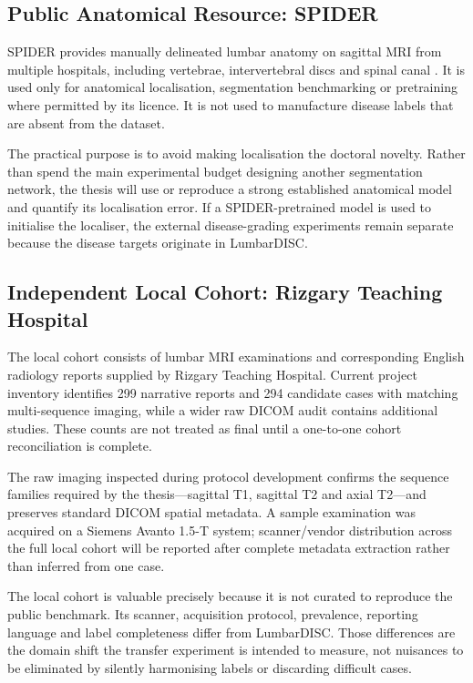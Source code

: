 \subsection{Public Anatomical Resource: SPIDER}
\label{sec:method-spider}

SPIDER provides manually delineated lumbar anatomy on sagittal MRI from multiple
hospitals, including vertebrae, intervertebral discs and spinal canal
\cite{vandergraaf2024lumbar}. It is used only for anatomical localisation,
segmentation benchmarking or pretraining where permitted by its licence. It is
not used to manufacture disease labels that are absent from the dataset.

The practical purpose is to avoid making localisation the doctoral novelty.
Rather than spend the main experimental budget designing another segmentation
network, the thesis will use or reproduce a strong established anatomical model
and quantify its localisation error. If a SPIDER-pretrained model is used to
initialise the localiser, the external disease-grading experiments remain
separate because the disease targets originate in LumbarDISC.

\subsection{Independent Local Cohort: Rizgary Teaching Hospital}
\label{sec:method-rizgary}

The local cohort consists of lumbar MRI examinations and corresponding English
radiology reports supplied by Rizgary Teaching Hospital. Current project
inventory identifies 299 narrative reports and 294 candidate cases with matching
multi-sequence imaging, while a wider raw DICOM audit contains additional
studies. These counts are not treated as final until a one-to-one cohort
reconciliation is complete.

The raw imaging inspected during protocol development confirms the sequence
families required by the thesis---sagittal T1, sagittal T2 and axial T2---and
preserves standard DICOM spatial metadata. A sample examination was acquired on
a Siemens Avanto 1.5-T system; scanner/vendor distribution across the full local
cohort will be reported after complete metadata extraction rather than inferred
from one case.

The local cohort is valuable precisely because it is not curated to reproduce
the public benchmark. Its scanner, acquisition protocol, prevalence, reporting
language and label completeness differ from LumbarDISC. Those differences are
the domain shift the transfer experiment is intended to measure, not nuisances
to be eliminated by silently harmonising labels or discarding difficult cases.

